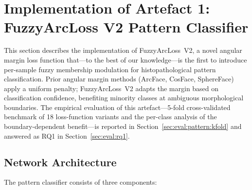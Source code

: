 \section{Implementation of Artefact 1: FuzzyArcLoss V2 Pattern Classifier}
\label{sec:impl:pattern}

This section describes the implementation of FuzzyArcLoss~V2, a novel
angular margin loss function that---to the best of our knowledge---is
the first to introduce per-sample fuzzy membership modulation for
histopathological pattern classification.
Prior angular margin methods (ArcFace, CosFace, SphereFace) apply a
uniform penalty; FuzzyArcLoss~V2 adapts the margin based on
classification confidence, benefiting minority classes at ambiguous
morphological boundaries.
The empirical evaluation of this artefact---5-fold cross-validated
benchmark of 18 loss-function variants and the per-class analysis of
the boundary-dependent benefit---is reported in
Section~\ref{sec:eval:pattern:kfold} and answered as RQ1 in
Section~\ref{sec:eval:rq1}.

\subsection{Network Architecture}
\label{sec:impl:pattern:arch}

The pattern classifier consists of three components:

